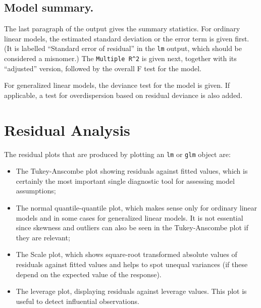 \documentclass{article}
\providecommand{\T}{\texttt}
\begin{document}
\subsection{Model summary.}
The last paragraph of the output gives the summary statistics.
For ordinary linear models, the estimated standard deviation or the error
term is given first. (It is labelled ``Standard error of residual'' in the 
\T{lm} output, which should be considered a misnomer.)
The \T{Multiple R\^{}2} is given next, together with its ``adjusted''
version, followed by the overall F test for the model.

For generalized linear models, the deviance test for the model is given.
If applicable, a test for overdispersion based on residual deviance is also
added. 



\section{Residual Analysis}
The residual plots that are produced by plotting an \T{lm} or \T{glm}
object are: 
\begin{itemize}
\item 
The Tukey-Anscombe plot showing residuals against fitted values,
which is certainly the most important single diagnostic tool for assessing
model assumptions;
\item
The normal quantile-quantile plot, which makes sense only for ordinary
linear models and in some cases for generalized linear models. 
It is not essential since skewness and outliers can also be seen in the
Tukey-Anscombe plot if they are relevant;
\item
The Scale plot, which shows square-root transformed absolute values of
residuals against 
fitted values and helps to spot unequal variances (if these depend on the
expected value of the response).
\item
The leverage plot, displaying residuals against leverage values.
This plot is useful to detect influential observations.
\end{itemize}
\end{document}
